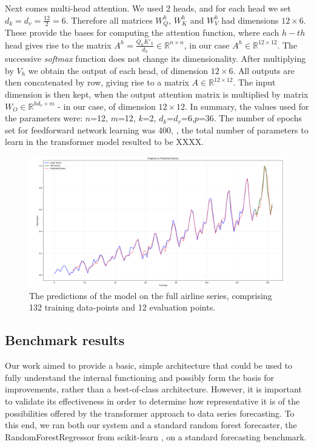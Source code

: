 \documentclass[algorithms,article,submit,pdftex,moreauthors]{Definitions/mdpi}
\begin{document}
Next comes multi-head attention. We used 2 heads, and for each head we set $d_k = d_v = \frac{12}{2} = 6$. Therefore all matrices $W^h_Q$, $W^h_K$ and $W^h_V$ had dimensions $12 \times 6$. These provide the bases for computing the attention function, where each $h-th$ head gives rise to the matrix $A^h=\frac{Q_hK'_h}{d_h} \in \mathbb{R}^{n \times n}$, in our case $A^h \in \mathbb{R}^{12 \times 12}$. The successive {\em softmax} function does not change its dimensionality. After multiplying by $V_h$ we obtain the output of each head, of dimension $12 \times 6$. All outputs are then concatenated by row, giving rise to a matrix $A \in \mathbb{R}^{12 \times 12}$. The input dimension is then kept, when the output attention matrix is multiplied by matrix $W_O \in \mathbb{R}^{hd_v \times m}$ - in our case, of dimension $12 \times 12$. In summary, the values used for the parameters were: $n$=12, $m$=12, $k$=2, $d_k$=$d_v$=6,$p$=36. The number of epochs set for feedforward network learning was 400, , the total number of parameters to learn in the transformer model resulted to be XXXX.

\begin{figure}
	\centering
	\includegraphics[width=0.90\linewidth]{airlines.png}
	\caption{The predictions of the model on the full airline series, comprising 132 training data-points and 12 evaluation points.}
	\label{fig:airlines}
\end{figure}

\subsection{Benchmark results} \label{subsec:benchmark}

Our work aimed to provide a basic, simple architecture that could be used to fully understand the internal functioning and possibly form the basis for improvements, rather than a best-of-class architecture. However, it is important to validate its effectiveness in order to determine how representative it is of the possibilities offered by the transformer approach to data series forecasting. To this end, we ran both our system and a standard random forest forecaster, the RandomForestRegressor from scikit-learn \cite{GEW06}, on a standard forecasting benchmark.
\end{document}
